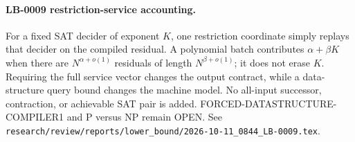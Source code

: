 \paragraph{LB-0009 restriction-service accounting.}
For a fixed SAT decider of exponent $K$, one restriction coordinate simply
replays that decider on the compiled residual.  A polynomial batch contributes
$\alpha+\beta K$ when there are $N^{\alpha+o(1)}$ residuals of length
$N^{\beta+o(1)}$; it does not erase $K$.  Requiring the full service vector
changes the output contract, while a data-structure query bound changes the
machine model.  No all-input successor, contraction, or achievable SAT pair is
added.  FORCED-DATASTRUCTURE-COMPILER1 and P versus NP remain OPEN.  See
\texttt{research/review/reports/lower\_bound/2026-10-11\_0844\_LB-0009.tex}.
